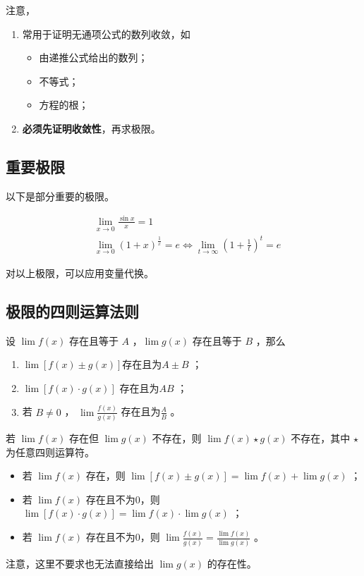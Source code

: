 注意，
\begin{enumerate}
    \item 常用于证明无通项公式的数列收敛，如
    \begin{itemize}
        \item 由递推公式给出的数列；
        \item 不等式；
        \item 方程的根；
    \end{itemize}
    \item \textbf{必须先证明收敛性}，再求极限。
\end{enumerate}

\subsection{重要极限}

以下是部分重要的极限。

\begin{equation*}
    \begin{aligned}
        &\lim_{x\rightarrow0}\frac{\sin x}{x}=1 \\     
        &\lim_{x\rightarrow0}(1+x)^{\frac 1x}=e\Leftrightarrow \lim_{t\rightarrow\infty}(1+\frac 1t)^t=e
    \end{aligned}
\end{equation*}

对以上极限，可以应用变量代换。

\subsection{极限的四则运算法则}

设 $ \lim f(x) $ 存在且等于 $ A $ ，$ \lim g(x) $ 存在且等于 $ B $ ，那么
\begin{enumerate}
    \item $ \lim[f(x)\pm g(x)]$存在且为$A\pm B $ ；
    \item $ \lim[f(x)\cdot{} g(x)]$ 存在且为$ AB $ ；
    \item 若 $ B\neq0 $ ， $ \lim\frac{f(x)}{g(x)} $ 存在且为$ \frac AB $ 。
\end{enumerate}

若 $ \lim f(x) $ 存在但 $ \lim g(x) $ 不存在，则 $ \lim f(x)\star g(x) $ 不存在，其中 $ \star $ 为任意四则运算符。

\begin{Field}[广义极限四则运算]

    \begin{itemize}
        \item 若 $ \lim f(x) $ 存在，则 $ \lim [f(x)\pm g(x)]=\lim f(x) + \lim g(x) $ ；
        \item 若 $ \lim f(x) $ 存在且不为0，则 $ \lim [f(x)\cdot{} g(x)]=\lim f(x) \cdot{} \lim g(x) $ ；
        \item 若 $ \lim f(x) $ 存在且不为0，则 $ \lim \frac{f(x)}{g(x)}=\frac{\lim f(x)}{\lim g(x)}$ 。
    \end{itemize}
    注意，这里不要求也无法直接给出 $ \lim g(x) $ 的存在性。
\end{Field}

